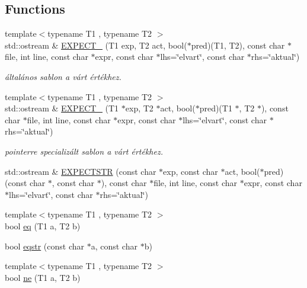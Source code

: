 \subsection*{Functions}
\begin{DoxyCompactItemize}
\item 
{\footnotesize template$<$typename T1 , typename T2 $>$ }\\std\+::ostream \& \mbox{\hyperlink{namespacegtest__lite_a73d2ede1d983327aea4fdd5b1d2709ce}{E\+X\+P\+E\+C\+T\+\_\+}} (T1 exp, T2 act, bool($\ast$pred)(T1, T2), const char $\ast$file, int line, const char $\ast$expr, const char $\ast$lhs=\char`\"{}elvart\char`\"{}, const char $\ast$rhs=\char`\"{}aktual\char`\"{})
\begin{DoxyCompactList}\small\item\em általános sablon a várt értékhez. \end{DoxyCompactList}\item 
{\footnotesize template$<$typename T1 , typename T2 $>$ }\\std\+::ostream \& \mbox{\hyperlink{namespacegtest__lite_a835d542f226b31cf5cd28033303aa7d7}{E\+X\+P\+E\+C\+T\+\_\+}} (T1 $\ast$exp, T2 $\ast$act, bool($\ast$pred)(T1 $\ast$, T2 $\ast$), const char $\ast$file, int line, const char $\ast$expr, const char $\ast$lhs=\char`\"{}elvart\char`\"{}, const char $\ast$rhs=\char`\"{}aktual\char`\"{})
\begin{DoxyCompactList}\small\item\em pointerre specializált sablon a várt értékhez. \end{DoxyCompactList}\item 
std\+::ostream \& \mbox{\hyperlink{namespacegtest__lite_aea477921e4c26d2a2806bc3011066270}{E\+X\+P\+E\+C\+T\+S\+TR}} (const char $\ast$exp, const char $\ast$act, bool($\ast$pred)(const char $\ast$, const char $\ast$), const char $\ast$file, int line, const char $\ast$expr, const char $\ast$lhs=\char`\"{}elvart\char`\"{}, const char $\ast$rhs=\char`\"{}aktual\char`\"{})
\item 
{\footnotesize template$<$typename T1 , typename T2 $>$ }\\bool \mbox{\hyperlink{namespacegtest__lite_a884f0c7c25d80d78a73c759a8fc43a3d}{eq}} (T1 a, T2 b)
\item 
bool \mbox{\hyperlink{namespacegtest__lite_a34055f353dabbe4ed9063f1d36af6022}{eqstr}} (const char $\ast$a, const char $\ast$b)
\item 
{\footnotesize template$<$typename T1 , typename T2 $>$ }\\bool \mbox{\hyperlink{namespacegtest__lite_a2f36af995c570e62f68c148f7393eb54}{ne}} (T1 a, T2 b)

\end{DoxyCompactItemize}
